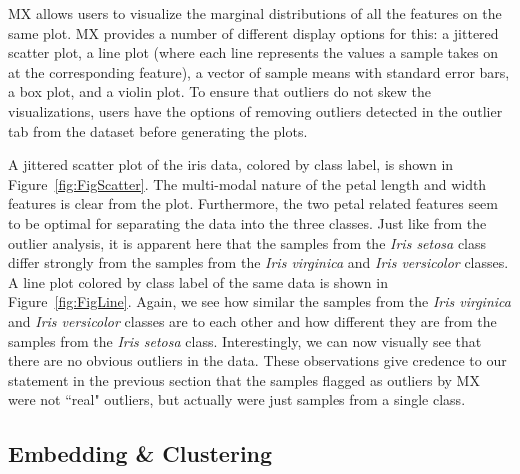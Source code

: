 \documentclass[twoside,leqno,twocolumn]{article}
\begin{document}
MX allows users to visualize the marginal distributions of all the features on the same plot. MX provides a number of different display options for this: a jittered scatter plot, a line plot (where each line represents the values a sample takes on at the corresponding feature), a vector of sample means with standard error bars, a box plot, and a violin plot. To ensure that outliers do not skew the visualizations, users have the options of removing outliers detected in the outlier tab from the dataset before generating the plots. 

A jittered scatter plot of the iris data, colored by class label, is shown in Figure~\ref{fig:FigScatter}. The multi-modal nature of the petal length and width features is clear from the plot. Furthermore, the two petal related features seem to be optimal for separating the data into the three classes. Just like from the outlier analysis, it is apparent here that the samples from the \textit{Iris setosa} class differ strongly from the samples from the \textit{Iris virginica} and \textit{Iris versicolor} classes. A line plot colored by class label of the same data is shown in Figure~\ref{fig:FigLine}. Again, we see how similar the samples from the \textit{Iris virginica} and \textit{Iris versicolor} classes are to each other and how different they are from the samples from the \textit{Iris setosa} class. Interestingly, we can now visually see that there are no obvious outliers in the data. These observations give credence to our statement in the previous section that the samples flagged as outliers by MX were not ``real" outliers, but actually were just samples from a single class.

\subsection{Embedding \& Clustering}
\label{subsec:SubSecEmbedding}
\end{document}
